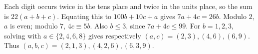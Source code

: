 Each digit occurs twice in the tens place and twice in the units place, so the sum is $22(a+b+c)$. Equating this to $100b+10c+a$ gives $7a+4c=26b$. Modulo $2$, $a$ is even; modulo $7$, $4c\equiv5b$. Also $b\le3$, since $7a+4c\le99$. For $b=1,2,3$, solving with $a\in\{2,4,6,8\}$ gives respectively $(a,c)=(2,3),(4,6),(6,9)$. Thus $\boxed{(a,b,c)=(2,1,3),(4,2,6),(6,3,9)}$.
